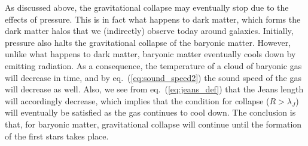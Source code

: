 \documentclass[11pt, a4paper,oneside,openright]{book}
\numberwithin{equation}{section}
\begin{document}
As discussed above, the gravitational collapse may eventually stop due to the effects of pressure. This is in fact what happens to dark matter, which forms the dark matter halos that we (indirectly) observe today around galaxies. Initially, pressure also halts the gravitational collapse of the baryonic matter. However, unlike what happens to dark matter, baryonic matter eventually cools down by emitting radiation. As a consequence, the temperature of a cloud of baryonic gas will decrease in time, and by eq.\ (\ref{eq:sound_speed2}) the sound speed of the gas will decrease as well. Also, we see from eq.\ (\ref{eq:jeans_def}) that the Jeans length will accordingly decrease, which implies that the condition for collapse ($R>\lambda_J$) will eventually be satisfied as the gas continues to cool down. The conclusion is that, for baryonic matter, gravitational collapse will continue until the formation of the first stars takes place.
\end{document}
